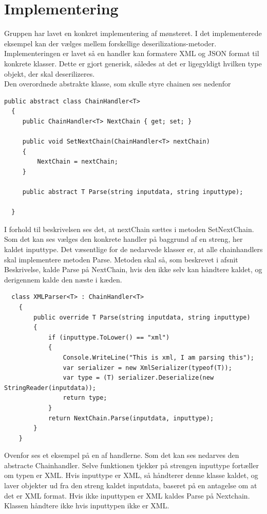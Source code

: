 \chapter{Implementering}

Gruppen har lavet en konkret implementering af mønsteret. I det implementerede eksempel kan der vælges mellem forskellige deserilizations-metoder. Implementeringen er lavet så en handler kan formatere XML og JSON format til konkrete klasser. Dette er gjort generisk, således at det er ligegyldigt hvilken type objekt, der skal deserilizeres. 
\\
\noindent Den overordnede abstrakte klasse, som skulle styre chainen ses nedenfor

\begin{lstlisting}
public abstract class ChainHandler<T>
  {
     public ChainHandler<T> NextChain { get; set; }

     public void SetNextChain(ChainHandler<T> nextChain)
     {
         NextChain = nextChain;
     }

     public abstract T Parse(string inputdata, string inputtype);

  }
\end{lstlisting}  

I forhold til beskrivelsen ses det, at nextChain sættes i metoden SetNextChain. Som det kan ses vælges den konkrete handler på baggrund af en streng, her kaldet inputtype. Det væsentlige for de nedarvede klasser er, at alle chainhandlers skal implementere metoden Parse. Metoden skal så, som beskrevet i afsnit Beskrivelse, kalde Parse på NextChain, hvis den ikke selv kan håndtere kaldet, og derigennem kalde den næste i kæden.

\begin{lstlisting}
  class XMLParser<T> : ChainHandler<T>
    {
        public override T Parse(string inputdata, string inputtype)
        {
            if (inputtype.ToLower() == "xml")
            {
                Console.WriteLine("This is xml, I am parsing this");
                var serializer = new XmlSerializer(typeof(T));
                var type = (T) serializer.Deserialize(new StringReader(inputdata));
                return type;
            }
            return NextChain.Parse(inputdata, inputtype);
        }
    }
\end{lstlisting} 

\noindent Ovenfor ses et eksempel på en af handlerne. Som det kan ses nedarves den abstracte Chainhandler. Selve funktionen tjekker på strengen inputtype fortæller om typen er XML. Hvis inputtype er XML, så håndterer denne klasse kaldet, og laver objekter ud fra den streng kaldet inputdata, baseret på en antagelse om at det er XML format. Hvis ikke inputtypen er XML kaldes Parse på Nextchain. Klassen håndtere ikke hvis inputtypen ikke er XML. 

